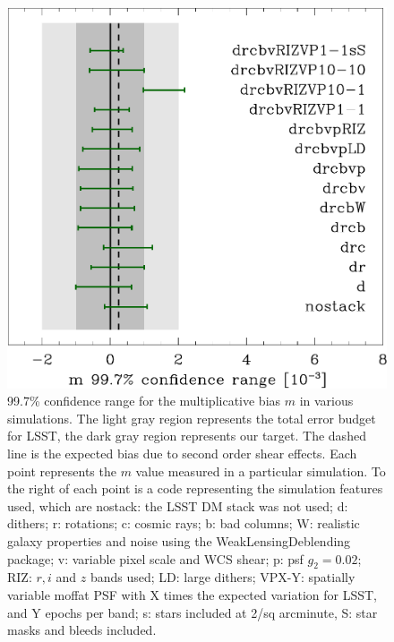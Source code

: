 \documentclass[iop, twocolappendix, appendixfloats, numberedappendix, apj]{hackemulateapj}
\begin{document}
\begin{figure}
    \includegraphics[width=\columnwidth]{code/mvals.pdf}
    \caption{99.7\% confidence range for the multiplicative bias $m$ in
     various simulations.  The light gray region represents the total
     error budget for LSST, the dark gray region represents our target.
     The dashed line is the expected bias due to second order shear effects.  Each
     point represents the $m$ value measured in a particular simulation.  To the right
     of each point is a code representing the simulation features used, which are
     nostack: the LSST DM stack was not used; d: dithers; r: rotations; c: cosmic rays;
     b: bad columns; W: realistic galaxy properties and noise using
      the WeakLensingDeblending package; v: variable pixel scale
     and WCS shear; p: psf $g_2 = 0.02$; RIZ: $r, i$ and $z$ bands used; LD: large dithers;
     VPX-Y: spatially variable moffat PSF with X times the expected variation for LSST,
     and Y epochs per band;  s: stars included at 2/sq arcminute, S: star masks and bleeds
     included.
    }
\end{figure}
\end{document}
